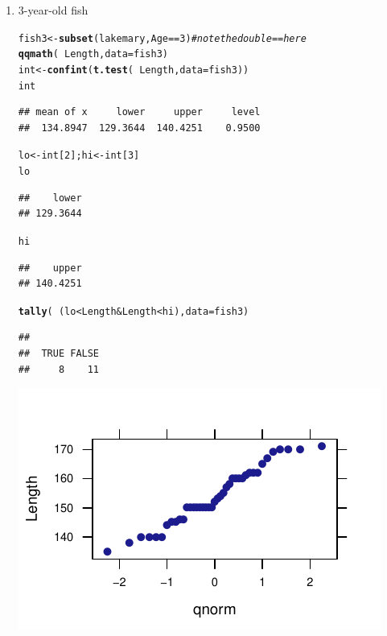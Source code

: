 \documentclass[twoside]{book}\usepackage[]{graphicx}\usepackage[]{xcolor}
\makeatletter
\def\maxwidth{ %
  \ifdim\Gin@nat@width>\linewidth
    \linewidth
  \else
    \Gin@nat@width
  \fi
}
\newcommand{\hlnum}[1]{\textcolor[rgb]{0.686,0.059,0.569}{#1}}%
\newcommand{\hlcom}[1]{\textcolor[rgb]{0.678,0.584,0.686}{\textit{#1}}}%
\newcommand{\hlopt}[1]{\textcolor[rgb]{0,0,0}{#1}}%
\newcommand{\hlstd}[1]{\textcolor[rgb]{0.345,0.345,0.345}{#1}}%
\newcommand{\hlkwb}[1]{\textcolor[rgb]{0.69,0.353,0.396}{#1}}%
\newcommand{\hlkwc}[1]{\textcolor[rgb]{0.333,0.667,0.333}{#1}}%
\newcommand{\hlkwd}[1]{\textcolor[rgb]{0.737,0.353,0.396}{\textbf{#1}}}%
\newenvironment{kframe}{%
 \def\at@end@of@kframe{}%
 \ifinner\ifhmode%
  \def\at@end@of@kframe{\end{minipage}}%
  \begin{minipage}{\columnwidth}%
 \fi\fi%
 \def\FrameCommand##1{\hskip\@totalleftmargin \hskip-\fboxsep
 \colorbox{shadecolor}{##1}\hskip-\fboxsep
     \hskip-\linewidth \hskip-\@totalleftmargin \hskip\columnwidth}%
 \MakeFramed {\advance\hsize-\width
   \@totalleftmargin\z@ \linewidth\hsize
   \@setminipage}}%
 {\par\unskip\endMakeFramed%
 \at@end@of@kframe}
\newenvironment{knitrout}{}{} %
\makeatother
\begin{document}
\begin{solution}
\begin{enumerate}
\item 3-year-old fish
\begin{knitrout}
\color{fgcolor}\begin{kframe}
\begin{alltt}
\hlstd{fish3} \hlkwb{<-} \hlkwd{subset}\hlstd{(lakemary, Age}\hlopt{==}\hlnum{3}\hlstd{)}  \hlcom{# note the double == here}
\hlkwd{qqmath}\hlstd{(}\hlopt{~}\hlstd{Length,} \hlkwc{data}\hlstd{=fish3)}
\hlstd{int} \hlkwb{<-} \hlkwd{confint}\hlstd{(}\hlkwd{t.test}\hlstd{(}\hlopt{~}\hlstd{Length,} \hlkwc{data}\hlstd{=fish3))}
\hlstd{int}
\end{alltt}
\begin{verbatim}
## mean of x     lower     upper     level 
##  134.8947  129.3644  140.4251    0.9500
\end{verbatim}
\begin{alltt}
\hlstd{lo} \hlkwb{<-} \hlstd{int[}\hlnum{2}\hlstd{]; hi} \hlkwb{<-} \hlstd{int[}\hlnum{3}\hlstd{]}
\hlstd{lo}
\end{alltt}
\begin{verbatim}
##    lower 
## 129.3644
\end{verbatim}
\begin{alltt}
\hlstd{hi}
\end{alltt}
\begin{verbatim}
##    upper 
## 140.4251
\end{verbatim}
\begin{alltt}
\hlkwd{tally} \hlstd{(} \hlopt{~} \hlstd{( lo} \hlopt{<} \hlstd{Length} \hlopt{&} \hlstd{Length} \hlopt{<} \hlstd{hi ),} \hlkwc{data}\hlstd{=fish3 )}
\end{alltt}
\begin{verbatim}
## 
##  TRUE FALSE 
##     8    11
\end{verbatim}
\end{kframe}

{\centering \includegraphics[width=\maxwidth]{figures/fig-unnamed-chunk-150-1} 

}
\end{knitrout}
\end{enumerate}
\end{solution}
\end{document}
